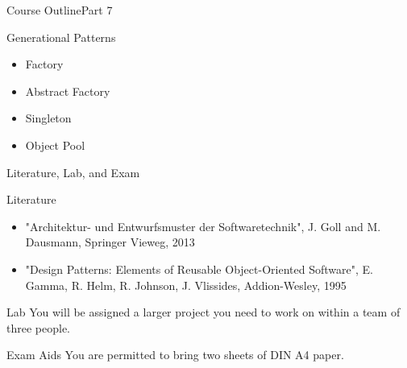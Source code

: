 \begin{frame}{Course Outline}{Part 7}
    \begin{block}{Generational Patterns}
       \begin{itemize}
           \item Factory
           \item Abstract Factory
           \item Singleton
           \item Object Pool
       \end{itemize}
    \end{block}
\end{frame}

\begin{frame}{Literature, Lab, and  Exam}
    \begin{block}{Literature}
       \begin{itemize}
           \item "Architektur- und Entwurfsmuster der Softwaretechnik", J. Goll and M. Dausmann, Springer Vieweg, 2013
           \item "Design Patterns: Elements of Reusable Object-Oriented Software", E. Gamma, R. Helm, R. Johnson, J. Vlissides, Addion-Wesley, 1995
       \end{itemize}
    \end{block}
    \begin{block}{Lab}
	You will be assigned a larger project you need to work on within a team of three people.
    \end{block}
    \begin{alertblock}{Exam Aids}
	You are permitted to bring two sheets of DIN A4 paper.
    \end{alertblock}
\end{frame}

%
%
%
%
%
%
%


